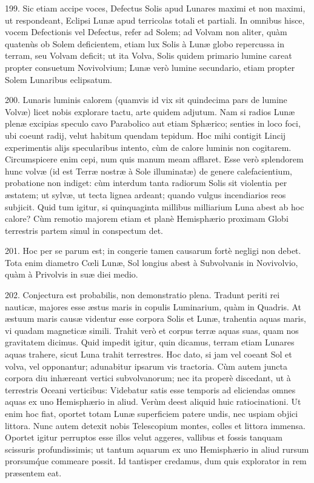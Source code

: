 \documentclass[a4paper, 11pt, oneside, polutonikogreek, german]{article}
\begin{document}
199. Sic etiam accipe voces, Defectus Solis apud Lunares maximi et non maximi, ut respondeant, Eclipsi Lunæ apud terricolas totali et partiali. In omnibus hisce, vocem Defectionis vel Defectus, refer ad Solem; ad Volvam non aliter, quàm quatenùs ob Solem deficientem, etiam lux Solis à Lunæ globo repercussa in terram, seu Volvam deficit; ut ita Volva, Solis quidem primario lumine careat propter consuetum Novivolvium; Lunæ verò lumine secundario, etiam propter Solem Lunaribus eclipsatum.

200. Lunaris luminis calorem (quamvis id vix sit quindecima pars de lumine Volvæ) licet nobis explorare tactu, arte quidem adjutum. Nam si radios Lunæ plenæ excipias speculo cavo Parabolico aut etiam Sphærico; senties in loco foci, ubi coeunt radij, velut habitum quendam tepidum. Hoc mihi contigit Lincij experimentis alijs specularibus intento, cùm de calore luminis non cogitarem. Circumspicere enim cepi, num quis manum meam afflaret.\hspace*{5mm}
Esse verò splendorem hunc volvæ (id est Terræ nostræ à Sole illuminatæ) de genere calefacientium, probatione non indiget: cùm interdum tanta radiorum Solis sit violentia per æstatem; ut sylvæ, ut tecta lignea ardeant; quando vulgus incendiarios reos subjicit. Quid tum igitur, si quinquaginta millibus milliarium Luna abest ab hoc calore? Cùm remotio majorem etiam et planè Hemisphærio proximam Globi terrestris partem simul in conspectum det.

201. Hoc per se parum est; in congerie tamen causarum fortè negligi non debet. Tota enim diametro Cœli Lunæ, Sol longius abest à Subvolvanis in Novivolvio, quàm à Privolvis in suæ diei medio.

202. Conjectura est probabilis, non demonstratio plena. Tradunt periti rei nauticæ, majores esse æstus maris in copulis Luminarium, quàm in Quadris. At æstuum maris causæ videntur esse corpora Solis et Lunæ, trahentia aquas maris, vi quadam magneticæ simili. Trahit verò et corpus terræ aquas suas, quam nos gravitatem dicimus. Quid impedit igitur, quin dicamus, terram etiam Lunares aquas trahere, sicut Luna trahit terrestres. Hoc dato, si jam vel coeant Sol et volva, vel opponantur; adunabitur ipsarum vis tractoria. Cùm autem juncta corpora diu inhæreant vertici subvolvanorum; nec ita properè discedant, ut à terrestris Oceani verticibus: Videbatur satis esse temporis ad eliciendas omnes aquas ex uno Hemisphærio in aliud. Verùm deest aliquid huic ratiocinationi. Ut enim hoc fiat, oportet totam Lunæ superficiem patere undis, nec uspiam objici littora. Nunc autem detexit nobis Telescopium montes, colles et littora immensa. Oportet igitur perruptos esse illos velut aggeres, vallibus et fossis tanquam scissuris profundissimis; ut tantum aquarum ex uno Hemisphærio in aliud rursum prorsum\'que commeare possit. Id tantisper credamus, dum quis explorator in rem præsentem eat.
\end{document}
